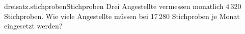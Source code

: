 \begin{exercise}{dreisatz.stichproben}{Stichproben}
  \ifproblem\problem
    Drei Angestellte vermessen monatlich 4\,320 Stichproben. Wie viele Angestellte
    müssen bei 17\,280 Stichproben je Monat eingesetzt werden?
  \fi
\end{exercise}
